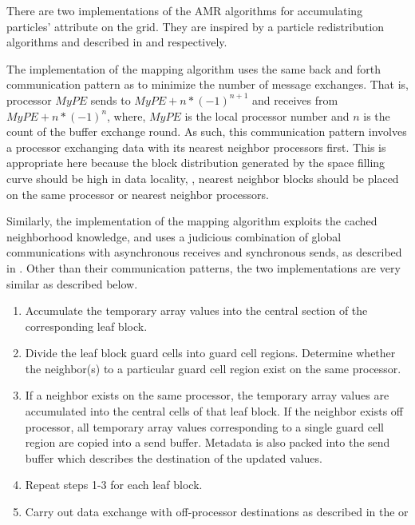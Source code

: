 There are two implementations of the AMR algorithms for accumulating
particles' attribute on the grid. They are inspired by a particle
redistribution algorithms  and 
described  in   and  respectively. 

The  implementation of the mapping algorithm uses the
same back and forth communication pattern as  to minimize
the number of message exchanges.  That is, processor $MyPE$ sends to
$MyPE+n*(-1)^{n+1}$ and receives from $MyPE+n*(-1)^{n}$, where, $MyPE$
is the local processor number and $n$ is the count of the buffer
exchange round.  As such, this communication pattern involves a
processor exchanging data with its nearest neighbor processors first.
This is appropriate here because the block distribution generated by
the space filling curve should be high in data locality, \ie,
nearest neighbor blocks should be placed  on the same processor or
nearest neighbor processors.  

Similarly, the  implementation of the mapping
algorithm exploits the cached neighborhood knowledge, and uses a
judicious combination of global communications with asynchronous
receives and synchronous sends, as described in . Other than their communication patterns, the two
implementations are very similar as described below.

\begin {enumerate}
\item Accumulate the temporary array values into the central section
 of the corresponding leaf block.
\item Divide the leaf block guard cells into guard cell regions.
  Determine whether the neighbor(s) to a particular guard cell region
  exist on the same processor.
\item If a neighbor exists on the same processor, the temporary
  array values are accumulated into the central cells of that leaf
  block.  If the neighbor exists off processor, all temporary array
  values corresponding to a single guard cell region are copied into a
  send buffer.  Metadata is also packed into the send buffer which
  describes the destination of the updated values.
\item Repeat steps 1-3 for each leaf block.
\item Carry out data exchange with off-processor destinations as
described in the  or 
\end {enumerate}


